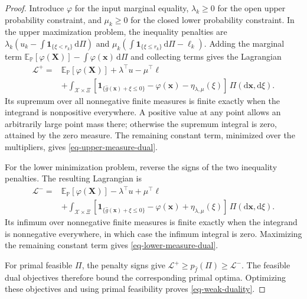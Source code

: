 \documentclass[review,11pt,3p,authoryear,nopreprintline]{elsarticle}
\begin{document}
\begin{proof}
  Introduce $\varphi$ for the input marginal equality, $\lambda_k\ge0$ for the open upper probability constraint, and $\mu_k\ge0$ for the closed lower probability constraint. In the upper maximization problem, the inequality penalties are
  $\lambda_k(u_k-\int\mathbf1_{\{\xi<r_k\}}\,\mathrm d\Pi)$ and
  $\mu_k(\int\mathbf1_{\{\xi\le r_k\}}\,\mathrm d\Pi-\ell_k)$.
  Adding the marginal term $\mathbb E_{\mathbb P}[\varphi(\bm X)]-\int\varphi(\bm x)\,\mathrm d\Pi$ and collecting terms gives the Lagrangian \citep[Section~5.1]{B.V04}
  \begin{equation}
    \begin{aligned}
      \mathcal L^+={}&\mathbb E_{\mathbb P}\left[\varphi(\bm X)\right]+\lambda^\top u-\mu^\top\ell\\
      &+\int_{\mathcal X\times\Xi}\left[\mathbf1_{\{\hat g(\bm x)+\xi\le0\}}-\varphi(\bm x)-\eta_{\lambda,\mu}(\xi)\right]\,\Pi\left(\mathrm d\bm x,\mathrm d\xi\right).
    \end{aligned}
    \label{eq-upper-lagrangian}
  \end{equation}
  Its supremum over all nonnegative finite measures is finite exactly when the integrand is nonpositive everywhere. A positive value at any point allows an arbitrarily large point mass there; otherwise the supremum integral is zero, attained by the zero measure. The remaining constant term, minimized over the multipliers, gives \eqref{eq-upper-measure-dual}.

  For the lower minimization problem, reverse the signs of the two inequality penalties. The resulting Lagrangian is
  \begin{equation}
    \begin{aligned}
      \mathcal L^-={}&\mathbb E_{\mathbb P}\left[\varphi(\bm X)\right]-\lambda^\top u+\mu^\top\ell\\
      &+\int_{\mathcal X\times\Xi}\left[\mathbf1_{\{\hat g(\bm x)+\xi\le0\}}-\varphi(\bm x)+\eta_{\lambda,\mu}(\xi)\right]\,\Pi\left(\mathrm d\bm x,\mathrm d\xi\right).
    \end{aligned}
    \label{eq-lower-lagrangian}
  \end{equation}
  Its infimum over nonnegative finite measures is finite exactly when the integrand is nonnegative everywhere, in which case the infimum integral is zero. Maximizing the remaining constant term gives \eqref{eq-lower-measure-dual}.

  For primal feasible $\Pi$, the penalty signs give $\mathcal L^+\ge p_{\hat f}(\Pi)\ge\mathcal L^-$. The feasible dual objectives therefore bound the corresponding primal optima. Optimizing these objectives and using primal feasibility proves \eqref{eq-weak-duality}.
\end{proof}
\end{document}
